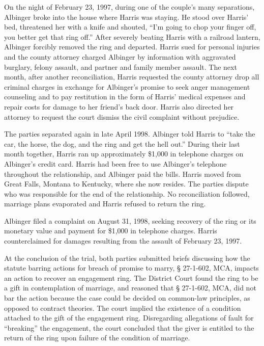 On the night of February 23, 1997, during one of the couple's many separations,
Albinger broke into the house where Harris was staying. He stood over Harris'
bed, threatened her with a knife and shouted, ``I'm going to chop your finger
off, you better get that ring off.'' After severely beating Harris with a
railroad lantern, Albinger forcibly removed the ring and departed. Harris sued
for personal injuries and the county attorney charged Albinger by information
with aggravated burglary, felony assault, and partner and family member
assault. The next month, after another reconciliation, Harris requested the
county attorney drop all criminal charges in exchange for Albinger's promise to
seek anger management counseling and to pay restitution in the form of Harris'
medical expenses and repair costs for damage to her friend's back door. Harris
also directed her attorney to request the court dismiss the civil complaint
without prejudice.

The parties separated again in late April 1998. Albinger told Harris to ``take
the car, the horse, the dog, and the ring and get the hell out.'' During their
last month together, Harris ran up approximately \$1,000 in telephone charges
on Albinger's credit card. Harris had been free to use Albinger's telephone
throughout the relationship, and Albinger paid the bills. Harris moved from
Great Falls, Montana to Kentucky, where she now resides. The parties dispute
who was responsible for the end of the relationship. No reconciliation
followed, marriage plans evaporated and Harris refused to return the ring. 

Albinger filed a complaint on August 31, 1998, seeking recovery of the ring or
its monetary value and payment for \$1,000 in telephone charges. Harris
counterclaimed for damages resulting from the assault of February 23, 1997.

At the conclusion of the trial, both parties submitted briefs discussing how the
statute barring actions for breach of promise to marry, {\S} 27-1-602, MCA,
impacts an action to recover an engagement ring. The District Court found the
ring to be a gift in contemplation of marriage, and reasoned that {\S}
27-1-602, MCA, did not bar the action because the case could be decided on
common-law principles, as opposed to contract theories. The court implied the
existence of a condition attached to the gift of the engagement ring.
Disregarding allegations of fault for ``breaking'' the engagement, the court
concluded that the giver is entitled to the return of the ring upon failure of
the condition of marriage.

